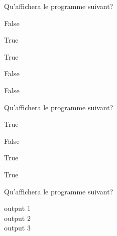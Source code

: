 \begin{Exercice}[5 minutes] Qu'affichera le programme suivant?
    
    

    \begin{solution}
        False 
        
        True 
        
        True 
        
        False 
        
        False
    \end{solution}
\end{Exercice}
    
\begin{Exercice}[5 minutes] Qu'affichera le programme suivant?
    
    

    \begin{solution}
        True 
        
        False 
        
        True 
        
        True
    \end{solution}
    
\end{Exercice}
    
\begin{Exercice}[5 minutes] Qu'affichera le programme suivant?
    
    

    \begin{solution}
        output 1\\
        output 2\\
        output 3
    \end{solution}
    
\end{Exercice}

